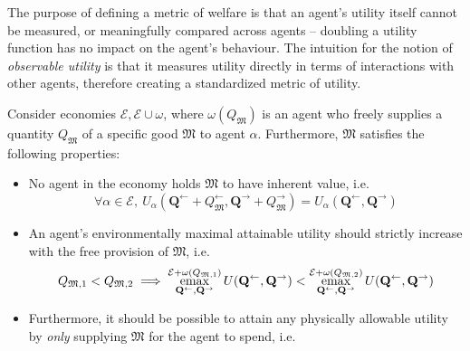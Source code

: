 \documentclass[smallextended]{svjour3}
\newcommand{\economy}{\ensuremath{\mathcal{E}}}
\newcommand{\emax}{\ensuremath{\operatornamewithlimits{emax}}}
\newcommand{\quants}{\ensuremath{Q}} %
\newcommand{\quantl}{\ensuremath{\mathbf{Q}}} %
\newcommand{\agenta}{\ensuremath{\alpha}}
\newcommand{\agentz}{\ensuremath{\omega}}
\newcommand{\money}{\ensuremath{\mathfrak{M}}}
\newcommand{\utility}{\ensuremath{U}}
\begin{document}
The purpose of defining a metric of welfare is that an agent's utility itself cannot be measured, or meaningfully compared across agents -- doubling a utility function has no impact on the agent's behaviour. The intuition for the notion of \emph{observable utility} is that it measures utility directly in terms of interactions with other agents, therefore creating a standardized metric of utility.

\begin{definition}
    \label{dfn:pfu}
    Consider economies $\economy, \economy\cup\agentz$, where $\agentz(\quants_\money)$ is an agent who freely supplies a quantity $\quants_\money$ of a specific good $\money$ to agent $\agenta$. Furthermore, $\money$ satisfies the following properties:
    \begin{itemize}
        \item No agent in the economy holds $\money$ to have inherent value, i.e. 
        \begin{equation}
            \label{eq:pwu1}
            \forall \agenta\in\economy,\  \utility_\agenta(\quantl^\leftarrow + \quants_\money^\leftarrow,\quantl^\rightarrow + \quants_\money^\rightarrow)=\utility_\agenta(\quantl^\leftarrow,\quantl^\rightarrow)
        \end{equation}
        \item An agent's environmentally maximal attainable utility should strictly increase with the free provision of $\money$, i.e. 
        \begin{equation}
            \label{eq:pwu2}
            \quants_{\money, 1} < \quants_{\money, 2} \implies \emax\limits_{\quantl^\leftarrow, \quantl^\rightarrow}^{\economy + \agentz(\quants_{\money, 1})} \utility(\quantl^\leftarrow, \quantl^\rightarrow) < \emax\limits_{\quantl^\leftarrow, \quantl^\rightarrow}^{\economy+\agentz(\quants_{\money, 2})} \utility(\quantl^\leftarrow, \quantl^\rightarrow)
        \end{equation}
        \item Furthermore, it should be possible to attain any physically allowable utility by \emph{only} supplying $\money$ for the agent to spend, i.e.

\end{itemize}
\end{definition}
\end{document}
